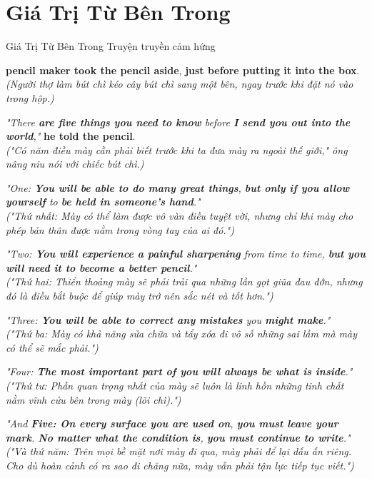 \section{Giá Trị Từ Bên Trong}
\begin{truyen}{Giá Trị Từ Bên Trong}%
              {Truyện truyền cảm hứng}

 \textbf{pencil maker took the pencil aside}, \textbf{just before putting it into the box}.\\
\textit{(Người thợ làm bút chì kéo cây bút chì sang một bên, ngay trước khi đặt nó vào trong hộp.)}

\textit{"There \textbf{are five things you need to know} before \textbf{I send you out into the world},"} \textbf{he told the pencil}.\\
\textit{("Có năm điều mày cần phải biết trước khi ta đưa mày ra ngoài thế giới," ông nâng niu nói với chiếc bút chì.)}

\textit{"One: \textbf{You will be able to do many great things}, \textbf{but only if you allow yourself} to \textbf{be held in someone's hand}."}\\
\textit{("Thứ nhất: Mày có thể làm được vô vàn điều tuyệt vời, nhưng chỉ khi mày cho phép bản thân được nằm trong vòng tay của ai đó.")}

\textit{"Two: \textbf{You will experience a painful sharpening} from time to time, \textbf{but you will need it to become a better pencil}."}\\
\textit{("Thứ hai: Thiển thoảng mày sẽ phải trải qua những lần gọt giũa đau đớn, nhưng đó là điều bắt buộc để giúp mày trở nên sắc nét và tốt hơn.")}

\textit{"Three: \textbf{You will be able to correct any mistakes} you \textbf{might make}."}\\
\textit{("Thứ ba: Mày có khả năng sửa chữa và tẩy xóa đi vô số những sai lầm mà mày có thể sẽ mắc phải.")}

\textit{"Four: \textbf{The most important part of you will always be what is inside}."}\\
\textit{("Thứ tư: Phần quan trọng nhất của mày sẽ luôn là linh hồn những tinh chất nằm vĩnh cửu bên trong mày (lõi chì).")}

\textit{"And \textbf{Five: On every surface you are used on}, \textbf{you must leave your mark}. \textbf{No matter what the condition is}, \textbf{you must continue to write}."}\\
\textit{("Và thứ năm: Trên mọi bề mặt nơi mày đi qua, mày phải để lại dấu ấn riêng. Cho dù hoàn cảnh có ra sao đi chăng nữa, mày vẫn phải tận lực tiếp tục viết.")}
\end{truyen}

